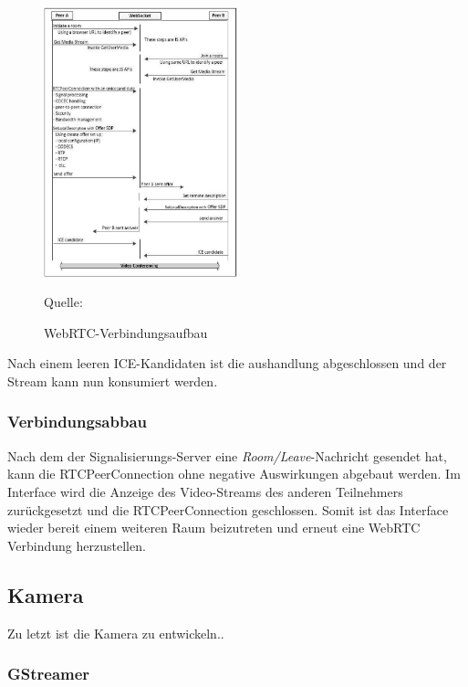 \documentclass{article}
\newcommand{\figuresource}[1]{
	\begin{center}Quelle: #1\end{center}
}
\begin{document}
\begin{onecolumn}

\begin{figure}[ht]
	\includegraphics[width=0.5\textwidth]{cited-webrtc-connection-establishment}
	\centering
	\caption[WebRTC-Verbindungsaufbau~\cite{WebRTC}]{WebRTC-Verbindungsaufbau}
	\figuresource{\cite{WebRTC}}
\end{figure}

Nach einem leeren ICE-Kandidaten ist die aushandlung abgeschlossen und der
Stream kann nun konsumiert werden.

\subsubsection{Verbindungsabbau}

Nach dem der Signalisierungs-Server eine \textit{Room/Leave}-Nachricht gesendet
hat, kann die RTCPeerConnection ohne negative Auswirkungen abgebaut werden. Im
Interface wird die Anzeige des Video-Streams des anderen Teilnehmers
zurückgesetzt und die RTCPeerConnection geschlossen. Somit ist das Interface
wieder bereit einem weiteren Raum beizutreten und erneut eine WebRTC Verbindung
herzustellen.


\subsection{Kamera}

Zu letzt ist die Kamera zu entwickeln..

\subsubsection{GStreamer}


\end{onecolumn}
\end{document}
